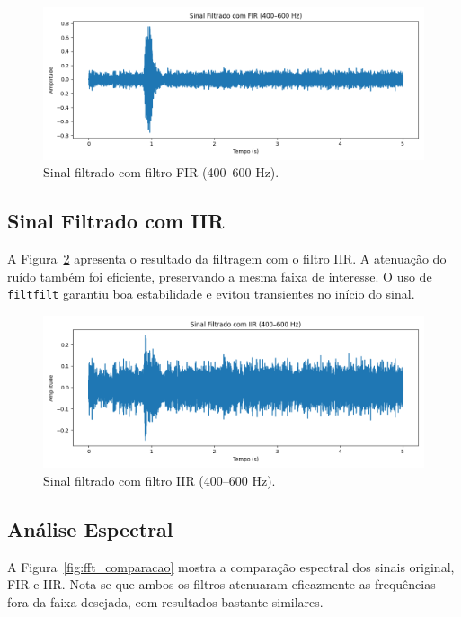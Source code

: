 \documentclass[a4paper,12pt]{article}
\begin{document}
	\begin{figure}[!htbp]
		\centering
		\captionsetup{skip=0pt} %
		\includegraphics[width=\textwidth,height=0.8\textheight,keepaspectratio]{fir_plot.png}
		\caption{Sinal filtrado com filtro FIR (400–600 Hz).}
		\label{fig:fir_plot}
	\end{figure}
	\subsection{Sinal Filtrado com IIR}
	A Figura~\ref{fig:iir_plot} apresenta o resultado da filtragem com o filtro IIR. A atenuação do ruído também foi eficiente, preservando a mesma faixa de interesse. O uso de \texttt{filtfilt} garantiu boa estabilidade e evitou transientes no início do sinal.
	
	\begin{figure}[!htbp]
		\centering
		\includegraphics[width=\textwidth,height=0.8\textheight,keepaspectratio]{iir_plot.png}
		\caption{Sinal filtrado com filtro IIR (400–600 Hz).}
		\label{fig:iir_plot}
	\end{figure}
	
	\subsection{Análise Espectral}
	A Figura~\ref{fig:fft_comparacao} mostra a comparação espectral dos sinais original, FIR e IIR. Nota-se que ambos os filtros atenuaram eficazmente as frequências fora da faixa desejada, com resultados bastante similares.
	
\end{document}
